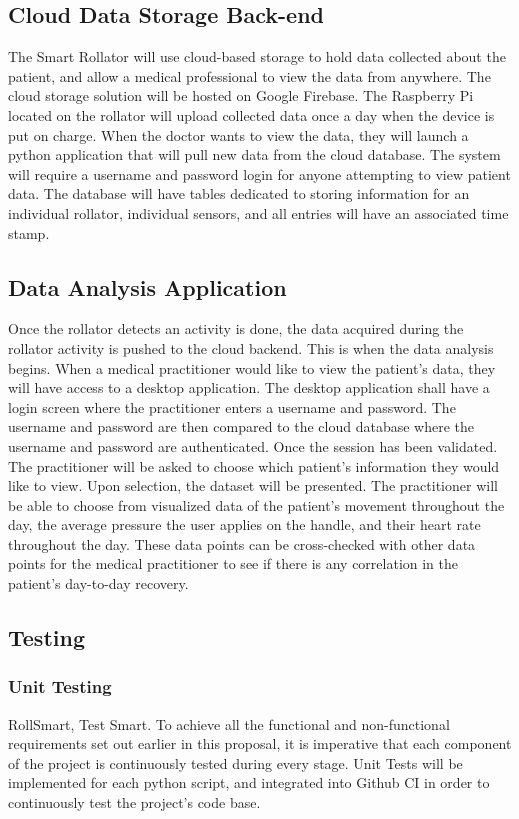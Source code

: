 \documentclass{article}
\begin{document}
\subsection{Cloud Data Storage Back-end}
The Smart Rollator will use cloud-based storage to hold data collected about the patient, and allow a medical professional to view the data from anywhere. The cloud storage solution will be hosted on Google Firebase. The Raspberry Pi located on the rollator will upload collected data once a day when the device is put on charge. When the doctor wants to view the data, they will launch a python application that will pull new data from the cloud database. The system will require a username and password login for anyone attempting to view patient data. The database will have tables dedicated to storing information for an individual rollator, individual sensors, and all entries will have an associated time stamp.

\subsection{Data Analysis Application}
Once the rollator detects an activity is done, the data acquired during the rollator activity is pushed to the cloud backend. This is when the data analysis begins. When a medical practitioner would like to view the patient's data, they will have access to a desktop application. The desktop application shall have a login screen where the practitioner enters a username and password. The username and password are then compared to the cloud database where the username and password are authenticated. Once the session has been validated. The practitioner will be asked to choose which patient’s information they would like to view. Upon selection, the dataset will be presented. The practitioner will be able to choose from visualized data of the patient's movement throughout the day, the average pressure the user applies on the handle, and their heart rate throughout the day. These data points can be cross-checked with other data points for the medical practitioner to see if there is any correlation in the patient's day-to-day recovery.

\subsection{Testing}
\subsubsection{Unit Testing}
RollSmart, Test Smart. To achieve all the functional and non-functional requirements set out earlier in this proposal, it is imperative that each component of the project is continuously tested during every stage. Unit Tests will be implemented for each python script, and integrated into Github CI in order to continuously test the project’s code base. 
\end{document}
